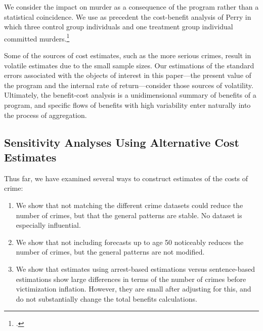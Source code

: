 \noindent We consider the impact on murder as a consequence of the program rather than a statistical coincidence. We use as precedent the cost-benefit analysis of Perry in which three control group individuals and one treatment group individual committed murders.\footnote{\citet{Heckman_Moon_etal_2010_RateofReturn}.}

Some of the sources of cost estimates, such as the more serious crimes, result in volatile estimates due to the small sample sizes. Our estimations of the standard errors associated with the objects of interest in this paper---the present value of the program and the internal rate of return---consider those sources of volatility. Ultimately, the benefit-cost analysis is a unidimensional summary of benefits of a program, and specific flows of benefits with high variability enter naturally into the process of aggregation.

%

\subsection{Sensitivity Analyses Using Alternative Cost Estimates}
\noindent Thus far, we have examined several ways to construct estimates of the costs of crime:

\begin{enumerate}
\item We show that not matching the different crime datasets could reduce the number of crimes, but that the general patterns are stable. No dataset is especially influential.
\item We show that not including forecasts up to age 50 noticeably reduces the number of crimes, but the general patterns are not modified.
\item We show that estimates using arrest-based estimations versus sentence-based estimations show large differences in terms of the number of crimes before victimization inflation. However, they are small after adjusting for this, and do not substantially change the total benefits calculations.
\end{enumerate}

